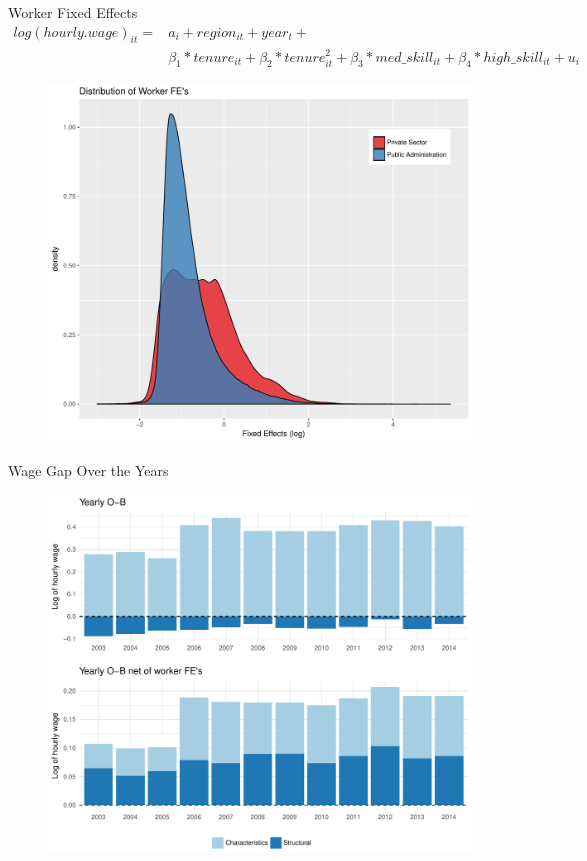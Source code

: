 \documentclass[xcolor={dvipsnames},8pt]{beamer}
\theoremstyle{definition}
\begin{document}
\begin{frame}{Worker Fixed Effects}
\tiny{
\begin{align*}
    log(hourly.wage)_{it} =& a_i + region_{it} + year_t + \\
     &\beta_1*tenure_{it} + \beta_2*tenure^2_{it} + \beta_3*med\_skill_{it} + \beta_4*high\_skill_{it} + u_i
\end{align*}}%

\begin{figure}[h]
    \centering
    \includegraphics[scale = 0.32]{001_fe_onepc.pdf}
\end{figure}
\end{frame}

\begin{frame}{Wage Gap Over the Years}
\begin{figure}[h]
    \centering
    \includegraphics[scale = 0.45]{002_yearly_ob_onepc.pdf}
\end{figure}
\end{frame}
\end{document}

